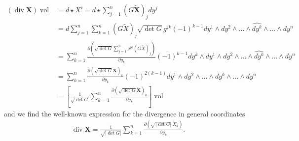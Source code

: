 \documentclass[12pt,a4paper]{article}
\numberwithin{equation}{subsection}
\numberwithin{lemma}{subsection}
\theoremstyle{definition}
\DeclareMathOperator{\diver}{div}
\DeclareMathOperator{\vol}{vol}
\begin{document}
\begin{align*}
    (\diver \mathbf{X}) \vol 
    &= d \star X^\flat 
    = d \star \sum_{j=1}^n (G \tilde{\mathbf{X}})_j dy^j 
    \\ &= d \sum_{j=1}^n \sum_{k=1}^n (G \tilde{X})_j 
        \sqrt{ \det G} g^{jk} (-1)^{k-1} dy^1 \wedge dy^2 \wedge ... \wedge 
        \widehat{dy^k} \wedge ... \wedge dy^n 
    \\ &= \sum_{k=1}^n \frac{\partial
        (\sqrt{ \det G} \sum_{j=1}^n g^{jk} (G \tilde{X})_j )}
        {\partial y_k} (-1)^{k-1} dy^k \wedge dy^1 \wedge dy^2 \wedge ... \wedge 
        \widehat{dy^k} \wedge ... \wedge dy^n 
    \\ &= \sum_{k=1}^n \frac{\partial (\sqrt{ \det G}  \tilde{\mathbf{X}})_k }
        {\partial y_k} (-1)^{2(k-1)} dy^1 \wedge dy^2 \wedge ... \wedge 
        dy^k \wedge ... \wedge dy^n
    \\ &= \left[ \frac{1}{\sqrt{ \det G}} \sum_{k=1}^n 
        \frac{\partial (\sqrt{ \det G}  \tilde{\mathbf{X}})_k }{\partial y_k}
        \right] \vol
\end{align*}
and we find the well-known expression for the divergence in general coordinates
\begin{align*}
    \diver \mathbf{X} = \frac{1}{\sqrt{ |\det G|}} \sum_{k=1}^n 
        \frac{\partial (\sqrt{ |\det G|} \, \tilde{X}_k )}{\partial y_k}.
\end{align*}
\end{document}
